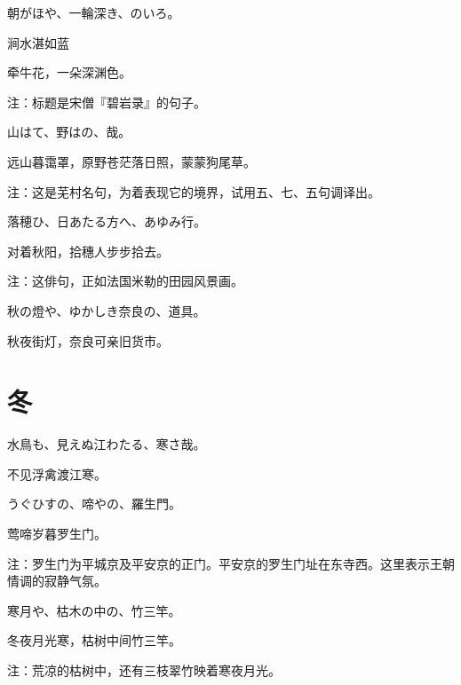 \begin{haiku}
    {\FH 朝がほや、一輪深き、のいろ。}

    {\FK 涧水湛如蓝}

    {\FK 牵牛花，一朵深渊色。}

    {\FT 注：标题是宋僧『碧岩录』的句子。}
\end{haiku}

\begin{haiku}
    {\FH 山はて、野はの、哉。}

    {\FK 远山暮霭罩，原野苍茫落日照，蒙蒙狗尾草。}

    {\FT 注：这是芜村名句，为着表现它的境界，试用五、七、五句调译出。}
\end{haiku}

\begin{haiku}
    {\FH 落穂ひ、日あたる方へ、あゆみ行。}

    {\FK 对着秋阳，拾穗人步步拾去。}

    {\FT 注：这俳句，正如法国米勒的田园风景画。}
\end{haiku}

\begin{haiku}
    {\FH 秋の燈や、ゆかしき奈良の、道具。}

    {\FK 秋夜街灯，奈良可亲旧货市。}
\end{haiku}

\section{\FK 冬}

\setcounter{haikucounter}{0}

\begin{haiku}
    {\FH 水鳥も、見えぬ江わたる、寒さ哉。}

    {\FK 不见浮禽渡江寒。}
\end{haiku}

\begin{haiku}
    {\FH うぐひすの、啼やの、羅生門。}

    {\FK 莺啼岁暮罗生门。}

    {\FT 注：罗生门为平城京及平安京的正门。平安京的罗生门址在东寺西。这里表示王朝情调的寂静气氛。}
\end{haiku}

\begin{haiku}
    {\FH 寒月や、枯木の中の、竹三竿。}

    {\FK 冬夜月光寒，枯树中间竹三竿。}

    {\FT 注：荒凉的枯树中，还有三枝翠竹映着寒夜月光。}
\end{haiku}

